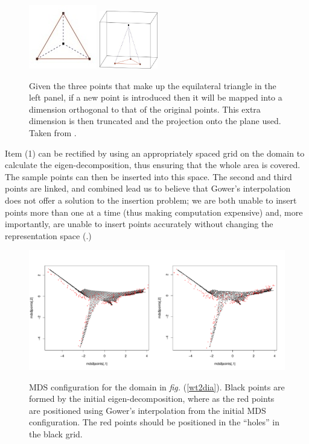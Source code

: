 \documentclass[a4paper,10pt]{amsart}
\newcommand{\fig}[1]{\emph{fig.} (\ref{#1})}
\begin{document}
\begin{figure}
\centering
\includegraphics{figs/boj0.jpg} \includegraphics[width=1in]{figs/boj1.jpg} \\
\caption{Given the three points that make up the equilateral triangle in the left panel, if a new point is introduced then it will be mapped into a dimension orthogonal to that of the original points. This extra dimension is then truncated and the projection onto the plane used. Taken from \cite{Boj2009}.}
\label{bojinsert}
\end{figure}

Item (1) can be rectified by using an appropriately spaced grid on the domain to calculate the eigen-decomposition, thus ensuring that the whole area is covered. The sample points can then be inserted into this space. The second and third points are linked, and combined lead us to believe that Gower's interpolation does not offer a solution to the insertion problem; we are both unable to insert points more than one at a time (thus making computation expensive) and, more importantly, are unable to insert points accurately without changing the representation space (\cite{Trosset2008}.)


\begin{figure}
\centering
\includegraphics[trim=8in 1in 1in 1in]{figs/gowererror.pdf} \\
\caption{MDS configuration for the domain in \fig{wt2dia}. Black points are formed by the initial eigen-decomposition, where as the red points are positioned using Gower's interpolation from the initial MDS configuration. The red points should be positioned in the ``holes'' in the black grid.}
\label{gowererror}
\end{figure}
\end{document}
